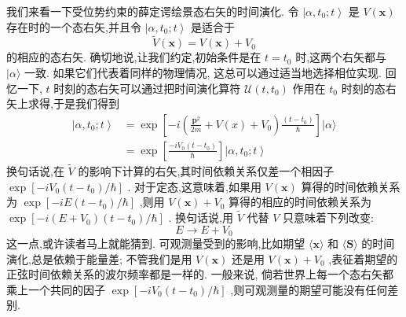 \documentclass[lang=cn,newtx,10pt,scheme=chinese,thmcnt=section]{elegantbook}
\begin{document}
我们来看一下受位势约束的薛定谔绘景态右矢的时间演化. 令 $\left| {\alpha ,{t}_{0};t}\right\rangle$ 是 $V\left( \mathbf{x}\right)$ 存在时的一个态右矢,并且令 $\left| {\alpha ,{t}_{0};t}\right\rangle$ 是适合于
\begin{equation}
	\widetilde{V}\left( \mathbf{x}\right) = V\left( \mathbf{x}\right) + {V}_{0}
\end{equation}
的相应的态右矢. 确切地说,让我们约定,初始条件是在 $t = {t}_{0}$ 时,这两个右矢都与 $|\alpha \rangle$ 一致. 如果它们代表着同样的物理情况, 这总可以通过适当地选择相位实现. 回忆一下, $t$ 时刻的态右矢可以通过把时间演化算符 $\mathcal{U}\left( {t,{t}_{0}}\right)$ 作用在 ${t}_{0}$ 时刻的态右矢上求得,于是我们得到
\begin{equation}
	\begin{aligned}
		\left| {\alpha ,{t}_{0};t}\right\rangle &= \exp \left\lbrack {-i\left( {\frac{{\mathbf{p}}^{2}}{2m} + V\left( x\right) + {V}_{0}}\right) \frac{\left( t - {t}_{0}\right) }{\hbar }}\right\rbrack |\alpha \rangle\\
		&= \exp \left\lbrack \frac{-i{V}_{0}\left( {t - {t}_{0}}\right) }{\hbar }\right\rbrack \left| {\alpha ,{t}_{0};t}\right\rangle
	\end{aligned}
\end{equation}
换句话说,在 $\widetilde{V}$ 的影响下计算的右矢,其时间依赖关系仅差一个相因子 $\exp \left\lbrack {-i{V}_{0}\left( {t - {t}_{0}}\right) /\hbar }\right\rbrack$ . 对于定态,这意味着,如果用 $V\left( \mathbf{x}\right)$ 算得的时间依赖关系为 $\exp \left\lbrack {-{iE}\left( {t - {t}_{0}}\right) /\hbar }\right\rbrack$ ,则用 $V\left( \mathbf{x}\right) + {V}_{0}$ 算得的相应的时间依赖关系为 $\exp \left\lbrack {-i\left( {E + {V}_{0}}\right) \left( {t - {t}_{0}}\right) /\hbar }\right\rbrack$ . 换句话说,用 $\widetilde{V}$ 代替 $V$ 只意味着下列改变:
\begin{equation}
	E \rightarrow E + {V}_{0}
\end{equation}
这一点,或许读者马上就能猜到. 可观测量受到的影响,比如期望 $\langle \mathbf{x}\rangle$ 和 $\langle \mathbf{S}\rangle$ 的时间演化,总是依赖于能量差; 不管我们是用 $V\left( \mathbf{x}\right)$ 还是用 $V\left( \mathbf{x}\right) + {V}_{0}$ ,表征着期望的正弦时间依赖关系的波尔频率都是一样的. 一般来说, 倘若世界上每一个态右矢都乘上一个共同的因子 $\exp \left\lbrack {-i{V}_{0}\left( {t - {t}_{0}}\right) /\hbar }\right\rbrack$ ,则可观测量的期望可能没有任何差别.
\end{document}
